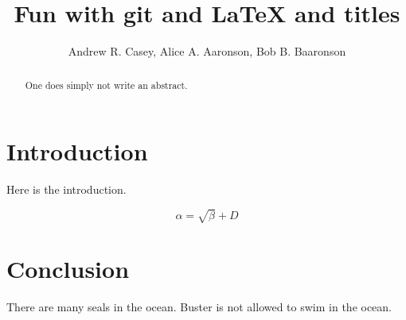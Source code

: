 \documentclass{article}
\begin{document}
\title{Fun with git and \LaTeX{} and titles}
\author{Andrew R. Casey, Alice A. Aaronson, Bob B. Baaronson}

\maketitle

\begin{abstract}
One does simply not write an abstract.
\end{abstract}

\section{Introduction}
Here is the introduction.

\begin{equation}
    \label{simple_equation}
    \alpha = \sqrt{ \beta } + D
\end{equation}


\section{Conclusion}
There are many seals in the ocean. Buster is not allowed to swim in the ocean.
\end{document}
